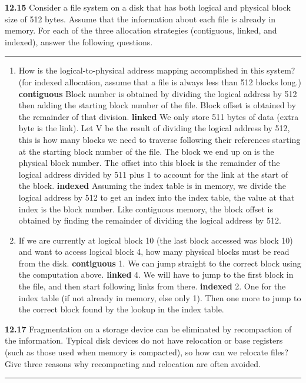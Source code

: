 \documentclass[12pt]{jhwhw}
\begin{document}
\clearpage
\textbf{12.15}  
	Consider a file system on a disk that has both logical and physical block
	size of 512 bytes. Assume that the information about each file is already in memory.
	For each of the three allocation strategies (contiguous, linked, and indexed),
	answer the following questions.
\textcolor[RGB]{240,240,240}{\rule{\textwidth}{0.5pt}}\bigbreak

	\begin{enumerate}
		\item How is the logical-to-physical address mapping accomplished in this system?
			(for indexed allocation, assume that a file is always less than 512 blocks long.)
			\textbf{contiguous}
				Block number is obtained by dividing the logical address by 512 then adding
				the starting block number of the file.
				Block offset is obtained by the remainder of that division.
			\bigbreak
			\textbf{linked}
				We only store 511 bytes of data (extra byte is the link).
				Let V be the result of dividing the logical address by 512, this is 
				how many blocks we need to traverse following their references
				starting at the starting block number of the file. The
				block we end up on is the physical block number. The offset into this
				block is the remainder of the logical address divided by 511 plus 1
				to account for the link at the start of the block.
			\bigbreak
			\textbf{indexed}
				Assuming the index table is in memory, we divide the logical address by 512
				to get an index into the index table, the value at that index
				is the block number.
				Like contiguous memory, the block offset is obtained by finding
				the remainder of dividing the logical address by 512.

		\item If we are currently at logical block 10 (the last block accessed was block 10)
			and want to access logical block 4, how many physical blocks must be read from
			the disk.
			\textbf{contiguous}
			1. We can jump straight to the correct block using the computation above.
			\bigbreak
			\textbf{linked}
			4. We will have to jump to the first block in the file, and then start
			following links from there.
			\bigbreak
			\textbf{indexed}
			2. One for the index table (if not already in memory, else only 1). Then
			one more to jump to the correct block found by the lookup in the index table.
	\end{enumerate}

\clearpage
\textbf{12.17}  
	Fragmentation on a storage device can be eliminated by recompaction of the
	information. Typical disk devices do not have relocation or base registers
	(such as those used when memory is compacted), so how can we relocate files?
	Give three reasons why recompacting and relocation are often avoided.
\textcolor[RGB]{240,240,240}{\rule{\textwidth}{0.5pt}}\bigbreak
\end{document}
